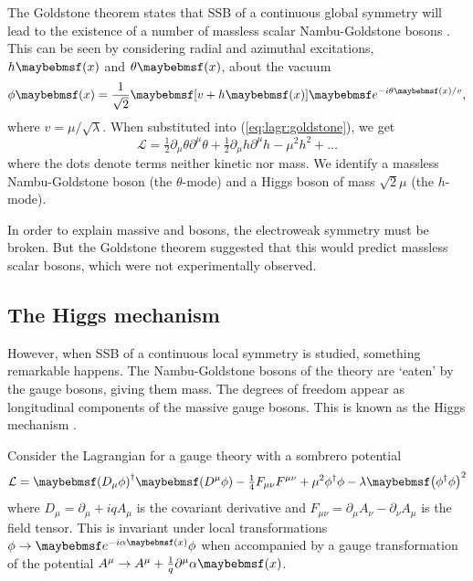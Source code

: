 The Goldstone theorem states that \ac{SSB} of a continuous global symmetry will lead to 
the existence of a number of massless scalar Nambu-Goldstone bosons \cite{Goldstone:1962}.
This can be seen by considering radial and azimuthal excitations, $h\parenths{x}$ and 
$\theta\parenths{x}$, about the vacuum 
\begin{equation}
	\phi\parenths{x} = \frac{1}{\sqrt{2}} \sqbracs{v + h\parenths{x}} \eexp{-i\theta\parenths{x} / v} ,
\end{equation}
where $v = \mu/\sqrt{\lambda}$. When substituted into (\ref{eq:lagr:goldstone}), we get
\begin{equation}
	\mathcal{L} = \tfrac{1}{2}\partial_{\mu}\theta \partial^{\mu}\theta
	+ \tfrac{1}{2}\partial_{\mu}h \partial^{\mu}h
	- \mu^2 h^2
	+ \dots
\end{equation}
where the dots denote terms neither kinetic nor mass. 
We identify a massless Nambu-Goldstone boson (the $\theta$-mode) and a Higgs boson of 
mass $\sqrt{2}\mu$ (the $h$-mode).

In order to explain massive \PWpm and \PZ bosons, the electroweak symmetry must be broken.
But the Goldstone theorem suggested that this would predict massless scalar bosons, which
were not experimentally observed.



\subsection{The Higgs mechanism}
\label{sec:ewsb:higgs}
However, when \ac{SSB} of a continuous local symmetry is studied, something remarkable 
happens. The Nambu-Goldstone bosons of the theory are `eaten' by the gauge bosons, giving 
them mass. The degrees of freedom appear as longitudinal components of the massive gauge 
bosons. This is known as the Higgs mechanism 
\cite{Englert:1964,Higgs:1964a,Higgs:1964b,Guralnik:1964,Higgs:1966}.

Consider the Lagrangian for a  gauge theory with a sombrero potential
\begin{equation}
	\mathcal{L} 
	= \parenths{D_{\mu}\phi}^{\dagger} \parenths{D^{\mu}\phi}
	- \tfrac{1}{4} F_{\mu\nu} F^{\mu\nu}
	+ \mu^2 \phi^{\dagger} \phi - \lambda \parenths{\phi^{\dagger} \phi}^2
	\label{eq:lagr:abelHiggs}
\end{equation}
where $D_{\mu} = \partial_{\mu} + iqA_{\mu}$ is the covariant derivative and $F_{\mu\nu} 
= \partial_{\mu}A_{\nu} - \partial_{\nu}A_{\mu}$ is the field tensor. This is invariant 
under local  transformations $\phi \rightarrow \eexp{-i\alpha\parenths{x}} \phi$
when accompanied by a gauge transformation of the potential 
$A^{\mu} \rightarrow A^{\mu} + \tfrac{1}{q}\partial^{\mu} \alpha\parenths{x}$.

